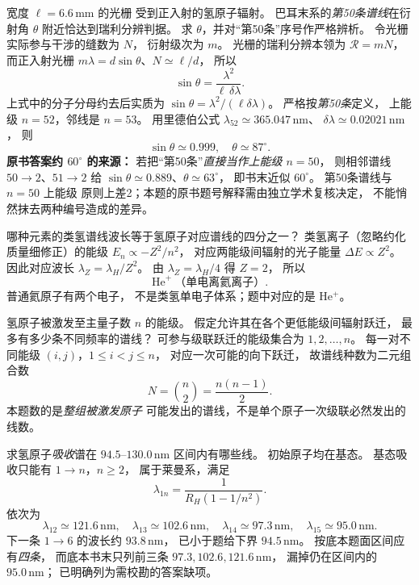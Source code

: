 宽度 $\ell=6.6\,\mathrm{mm}$ 的光栅
受到正入射的氢原子辐射。
巴耳末系的\emph{第50条谱线}在衍射角 $\theta$
附近恰达到瑞利分辨判据。
求 $\theta$，并对“第50条”序号作严格辨析。
\exsolution
令光栅实际参与干涉的缝数为 $N$，
衍射级次为 $m$。
光栅的瑞利分辨本领为
$\mathcal R=mN$，而正入射光栅
$m\lambda=d\sin\theta$、$N\simeq\ell/d$，
所以
\[
 \boxed{\sin\theta=
 \frac{\lambda^2}{\ell\,\delta\lambda}}.
\]
上式中的分子分母约去后实质为
$\sin\theta=\lambda^2/(\ell\delta\lambda)$。
严格按\emph{第50条}定义，
上能级 $n=52$，邻线是 $n=53$。
用里德伯公式
$\lambda_{52}\simeq365.047\,\mathrm{nm}$、
$\delta\lambda\simeq0.02021\,\mathrm{nm}$，
则
\[
 \boxed{\sin\theta\simeq0.999,\quad
 \theta\simeq87^\circ}.
\]
\textbf{原书答案约 $60^\circ$ 的来源：}
若把“第50条”\emph{直接当作上能级 $n=50$}，
则相邻谱线 $50\to2$、$51\to2$
给 $\sin\theta\simeq0.889$、$\theta\simeq63^\circ$，
即书末近似 $60^\circ$。
\excheck 第50条谱线与 $n=50$ 上能级
原则上差2；本题的原书题号解释需由独立学术复核决定，
不能悄然抹去两种编号造成的差异。

哪种元素的类氢谱线波长等于氢原子对应谱线的四分之一？
\exsolution
类氢离子（忽略约化质量细修正）的能级
$E_n\propto-Z^2/n^2$，
对应两能级间辐射的光子能量
$\Delta E\propto Z^2$。
因此对应波长
$\lambda_Z=\lambda_H/Z^2$。
由 $\lambda_Z=\lambda_H/4$ 得 $Z=2$，
所以
\[
 \boxed{\mathrm{He}^{+}\ \text{（单电离氦离子）}}.
\]
\excheck 普通氦原子有两个电子，
不是类氢单电子体系；题中对应的是 He$^+$。

氢原子被激发至主量子数 $n$ 的能级。
假定允许其在各个更低能级间辐射跃迁，
最多有多少条不同频率的谱线？
\exsolution
可参与级联跃迁的能级集合为
$1,2,\dots,n$。
每一对不同能级 $(i,j)$，$1\le i<j\le n$，
对应一次可能的向下跃迁，
故谱线种数为二元组合数
\[
 \boxed{N=\binom n2=\frac{n(n-1)}{2}}.
\]
\excheck 本题数的是\emph{整组被激发原子}
可能发出的谱线，不是单个原子一次级联必然发出的线数。

求氢原子\emph{吸收}谱在
$94.5$--$130.0\,\mathrm{nm}$ 区间内有哪些线。
初始原子均在基态。
\exsolution
基态吸收只能有 $1\to n$，$n\ge2$，
属于莱曼系，满足
\[
 \lambda_{1n}=
 \frac1{R_H(1-1/n^2)}.
\]
依次为
\[
 \boxed{\lambda_{12}\simeq121.6\,\mathrm{nm}},\quad
 \boxed{\lambda_{13}\simeq102.6\,\mathrm{nm}},\quad
 \boxed{\lambda_{14}\simeq97.3\,\mathrm{nm}},\quad
 \boxed{\lambda_{15}\simeq95.0\,\mathrm{nm}}.
\]
下一条 $1\to6$ 的波长约 $93.8\,\mathrm{nm}$，
已小于题给下界 $94.5\,\mathrm{nm}$。
\excheck 按底本题面区间应有\emph{四条}，
而底本书末只列前三条
$97.3,102.6,121.6\,\mathrm{nm}$，
漏掉仍在区间内的 $95.0\,\mathrm{nm}$；
已明确列为需校勘的答案缺项。
